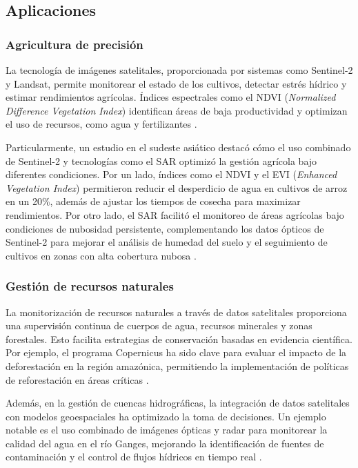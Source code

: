     \subsection{Aplicaciones}
        \subsubsection{Agricultura de precisión}
            La tecnología de imágenes satelitales, proporcionada por sistemas como Sentinel-2 y Landsat, permite monitorear el estado de los cultivos, detectar estrés hídrico y estimar rendimientos agrícolas. Índices espectrales como el NDVI (\textit{Normalized Difference Vegetation Index}) identifican áreas de baja productividad y optimizan el uso de recursos, como agua y fertilizantes \autocite{griffiths2019intra, ed2020recent}. 
            
            Particularmente, un estudio en el sudeste asiático destacó cómo el uso combinado de Sentinel-2 y tecnologías como el SAR optimizó la gestión agrícola bajo diferentes condiciones. Por un lado, índices como el NDVI y el EVI (\textit{Enhanced Vegetation Index}) permitieron reducir el desperdicio de agua en cultivos de arroz en un 20\%, además de ajustar los tiempos de cosecha para maximizar rendimientos. Por otro lado, el SAR facilitó el monitoreo de áreas agrícolas bajo condiciones de nubosidad persistente, complementando los datos ópticos de Sentinel-2 para mejorar el análisis de humedad del suelo y el seguimiento de cultivos en zonas con alta cobertura nubosa \autocite{kaushik2021crop}.
            
        \subsubsection{Gestión de recursos naturales}
            La monitorización de recursos naturales a través de datos satelitales proporciona una supervisión continua de cuerpos de agua, recursos minerales y zonas forestales. Esto facilita estrategias de conservación basadas en evidencia científica. Por ejemplo, el programa Copernicus ha sido clave para evaluar el impacto de la deforestación en la región amazónica, permitiendo la implementación de políticas de reforestación en áreas críticas \autocite{rast2019copernicus}. 
            
            Además, en la gestión de cuencas hidrográficas, la integración de datos satelitales con modelos geoespaciales ha optimizado la toma de decisiones. Un ejemplo notable es el uso combinado de imágenes ópticas y radar para monitorear la calidad del agua en el río Ganges, mejorando la identificación de fuentes de contaminación y el control de flujos hídricos en tiempo real \autocite{caballero2019sentinel, lisboa2024earth}.
            
